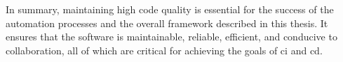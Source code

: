 In summary, maintaining high code quality is essential for the success of the automation processes and the overall framework described in this thesis. It 
ensures that the software is maintainable, reliable, efficient, and conducive to collaboration, all of which are critical for achieving the goals of \acrlong{ci} 
and \acrlong{cd}.